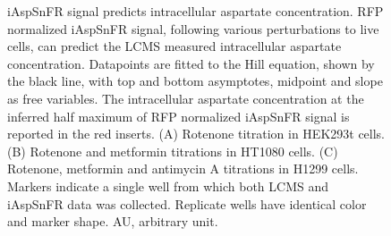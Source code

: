 \documentclass[9pt,lineno]{elife}
\begin{document}
\begin{figure}[ht!]
\centering
{}
\caption{
iAspSnFR signal predicts intracellular aspartate concentration.
RFP normalized iAspSnFR signal, following various perturbations to live cells, can predict the LCMS measured intracellular aspartate concentration.
Datapoints are fitted to the Hill equation, shown by the black line, with top and bottom asymptotes, midpoint and slope as free variables.
The intracellular aspartate concentration at the inferred half maximum of RFP normalized iAspSnFR signal is reported in the red inserts.
(A) Rotenone titration in HEK293t cells.
(B) Rotenone and metformin titrations in HT1080 cells.
(C) Rotenone, metformin and antimycin A titrations in H1299 cells.
Markers indicate a single well from which both LCMS and iAspSnFR data was collected.
Replicate wells have identical color and marker shape.
AU, arbitrary unit.
}
\label{fig:Fig3}
\label{figsupp:f3S1}
\end{figure}
\end{document}
